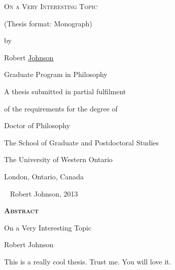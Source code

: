 \thispagestyle{empty}

\vspace*{\fill}
\begin{center}
\textsc{On a Very Interesting Topic}

\par
\vspace{12pt}
(Thesis format: Monograph)

\par
\vspace{0.5in}
by

\par
\vspace{0.5in}
Robert \underline{Johnson}

\par
\vspace{0.5in}
Graduate Program in Philosophy

\par
\vspace{0.5in}
A thesis submitted in partial fulfilment

of the requirements for the degree of

Doctor of Philosophy

\par
\vspace{0.5in}
The School of Graduate and Postdoctoral Studies

The University of Western Ontario

London, Ontario, Canada

\par
\vspace{0.5in}
\textcopyright \mbox{ } Robert Johnson, 2013
\end{center}
\vspace*{\fill}

\newpage

\onehalfspacing

\begin{center}\textbf{\textsc{Abstract}}\end{center}
\begin{center}
On a Very Interesting Topic

Robert Johnson
\end{center}

This is a really cool thesis. Trust me. You will love it.

\mbox{} \\

